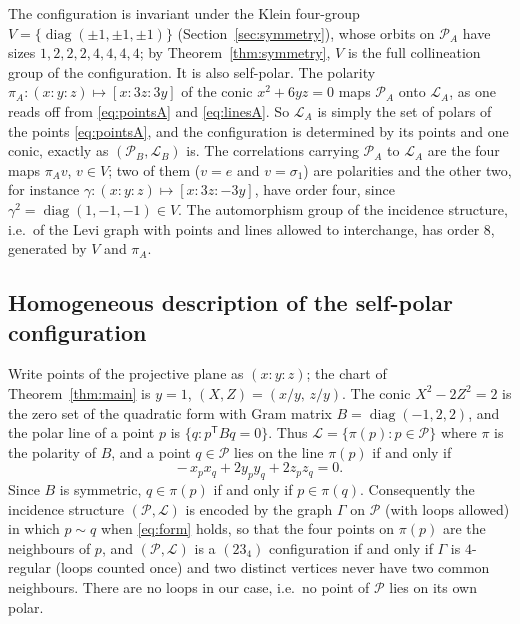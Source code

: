 \documentclass[11pt]{article}
\theoremstyle{plain}
\theoremstyle{definition}
\newcommand{\cP}{\mathcal{P}}
\newcommand{\cL}{\mathcal{L}}
\begin{document}
The configuration is invariant under the Klein four-group $V=\{\operatorname{diag}(\pm1,\pm1,\pm1)\}$ (Section~\ref{sec:symmetry}), whose orbits on $\cP_A$ have sizes $1,2,2,2,4,4,4,4$; by Theorem~\ref{thm:symmetry}, $V$ is the full collineation group of the configuration.  It is also self-polar.  The polarity $\pi_A\colon(x{:}y{:}z)\mapsto[x{:}3z{:}3y]$ of the conic $x^2+6yz=0$ maps $\cP_A$ onto $\cL_A$, as one reads off from \eqref{eq:pointsA} and \eqref{eq:linesA}.  So $\cL_A$ is simply the set of polars of the points \eqref{eq:pointsA}, and the configuration is determined by its points and one conic, exactly as $(\cP_B,\cL_B)$ is.  The correlations carrying $\cP_A$ to $\cL_A$ are the four maps $\pi_Av$, $v\in V$; two of them ($v=e$ and $v=\sigma_1$) are polarities and the other two, for instance $\gamma\colon(x{:}y{:}z)\mapsto[x{:}3z{:}-3y]$, have order four, since $\gamma^2=\operatorname{diag}(1,-1,-1)\in V$.  The automorphism group of the incidence structure, i.e.\ of the Levi graph with points and lines allowed to interchange, has order $8$, generated by $V$ and $\pi_A$.

\subsection{Homogeneous description of the self-polar configuration}
Write points of the projective plane as $(x:y:z)$; the chart of Theorem~\ref{thm:main} is $y=1$, $(X,Z)=(x/y,\,z/y)$.  The conic $X^2-2Z^2=2$ is the zero set of the quadratic form with Gram matrix $B=\operatorname{diag}(-1,2,2)$, and the polar line of a point $p$ is $\{q: p^{\mathsf T}Bq=0\}$.  Thus $\cL=\{\pi(p):p\in\cP\}$ where $\pi$ is the polarity of $B$, and a point $q\in\cP$ lies on the line $\pi(p)$ if and only if
\begin{equation}\label{eq:form}
-\,x_px_q+2y_py_q+2z_pz_q=0 .
\end{equation}
Since $B$ is symmetric, $q\in\pi(p)$ if and only if $p\in\pi(q)$.  Consequently the incidence structure $(\cP,\cL)$ is encoded by the graph $\Gamma$ on $\cP$ (with loops allowed) in which $p\sim q$ when \eqref{eq:form} holds, so that the four points on $\pi(p)$ are the neighbours of $p$, and $(\cP,\cL)$ is a $(23_4)$ configuration if and only if $\Gamma$ is $4$-regular (loops counted once) and two distinct vertices never have two common neighbours.  There are no loops in our case, i.e.\ no point of $\cP$ lies on its own polar.
\end{document}

